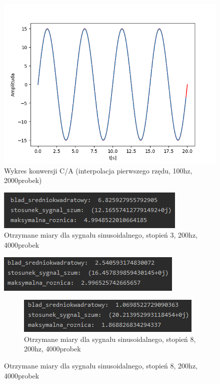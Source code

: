 \documentclass[12pt]{article}
\begin{document}
\begin{figure}[H]
\centering
\includegraphics[scale=0.6]{34sinusinterpolacja1rzedu100.png}
\caption{Wykres konwersji C/A (interpolacja pierwszego rzędu, 100hz, 2000probek)}
\end{figure}

\begin{figure}[H]
\centering
\includegraphics[scale=0.9]{333sinusMiarySt3.png}
\caption{Otrzymane miary dla sygnału sinusoidalnego, stopień 3, 200hz, 4000probek}
\end{figure}

\begin{figure}[H]
\centering
\includegraphics[scale=0.9]{3sinusMiary.png}
\caption{Otrzymane miary dla sygnału sinusoidalnego, stopień 5, 200hz, 4000probek}

\begin{figure}[H]
\centering
\includegraphics[scale=0.9]{333sinusMiarySt8.png}
\caption{Otrzymane miary dla sygnału sinusoidalnego, stopień 8, 200hz, 4000probek}
\end{figure}

\end{figure}
\end{document}
